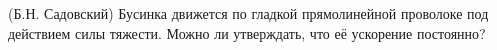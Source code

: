 (Б.Н. Садовский)
Бусинка движется по гладкой прямолинейной проволоке под действием
силы тяжести. Можно ли утверждать, что её ускорение постоянно?
